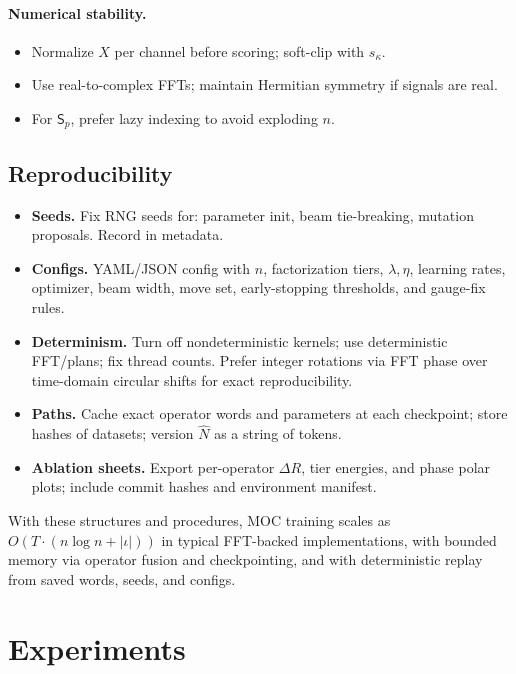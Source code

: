 \documentclass[12pt]{article}
\numberwithin{equation}{section}
\theoremstyle{plain}
\theoremstyle{definition}
\theoremstyle{remark}
\begin{document}
\paragraph{Numerical stability.}
\begin{itemize}
  \item Normalize \(X\) per channel before scoring; soft-clip with \(s_\kappa\).
  \item Use real-to-complex FFTs; maintain Hermitian symmetry if signals are real.
  \item For \(\mathsf{S}_p\), prefer lazy indexing to avoid exploding \(n\).
\end{itemize}

\subsection*{Reproducibility}
\begin{itemize}
  \item \textbf{Seeds.} Fix RNG seeds for: parameter init, beam tie-breaking, mutation proposals. Record in metadata.
  \item \textbf{Configs.} YAML/JSON config with \(n\), factorization tiers, \(\lambda,\eta\), learning rates, optimizer, beam width, move set, early-stopping thresholds, and gauge-fix rules.
  \item \textbf{Determinism.} Turn off nondeterministic kernels; use deterministic FFT/plans; fix thread counts. Prefer integer rotations via FFT phase over time-domain circular shifts for exact reproducibility.
  \item \textbf{Paths.} Cache exact operator words and parameters at each checkpoint; store hashes of datasets; version \(\widehat{N}\) as a string of tokens.
  \item \textbf{Ablation sheets.} Export per-operator \(\Delta R\), tier energies, and phase polar plots; include commit hashes and environment manifest.
\end{itemize}

\noindent With these structures and procedures, MOC training scales as \(O(T\cdot(n\log n + |\iota|))\) in typical FFT-backed implementations, with bounded memory via operator fusion and checkpointing, and with deterministic replay from saved words, seeds, and configs.

\section*{Experiments}
\end{document}
